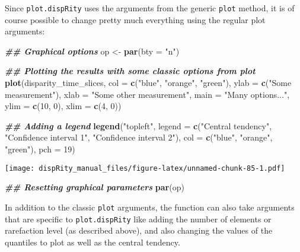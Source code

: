 \documentclass[
]{book}
\newenvironment{Shaded}{\begin{snugshade}}{\end{snugshade}}
\newcommand{\AttributeTok}[1]{\textcolor[rgb]{0.13,0.29,0.53}{#1}}
\newcommand{\DecValTok}[1]{\textcolor[rgb]{0.00,0.00,0.81}{#1}}
\newcommand{\DocumentationTok}[1]{\textcolor[rgb]{0.56,0.35,0.01}{\textbf{\textit{#1}}}}
\newcommand{\FunctionTok}[1]{\textcolor[rgb]{0.13,0.29,0.53}{\textbf{#1}}}
\newcommand{\NormalTok}[1]{#1}
\newcommand{\OtherTok}[1]{\textcolor[rgb]{0.56,0.35,0.01}{#1}}
\newcommand{\StringTok}[1]{\textcolor[rgb]{0.31,0.60,0.02}{#1}}
\begin{document}
Since \texttt{plot.dispRity} uses the arguments from the generic \texttt{plot} method, it is of course possible to change pretty much everything using the regular plot arguments:

\begin{Shaded}
\begin{Highlighting}[]
\DocumentationTok{\#\# Graphical options}
\NormalTok{op }\OtherTok{\textless{}{-}} \FunctionTok{par}\NormalTok{(}\AttributeTok{bty =} \StringTok{"n"}\NormalTok{)}

\DocumentationTok{\#\# Plotting the results with some classic options from plot}
\FunctionTok{plot}\NormalTok{(disparity\_time\_slices, }\AttributeTok{col =} \FunctionTok{c}\NormalTok{(}\StringTok{"blue"}\NormalTok{, }\StringTok{"orange"}\NormalTok{, }\StringTok{"green"}\NormalTok{),}
    \AttributeTok{ylab =} \FunctionTok{c}\NormalTok{(}\StringTok{"Some measurement"}\NormalTok{), }\AttributeTok{xlab =} \StringTok{"Some other measurement"}\NormalTok{,}
    \AttributeTok{main =} \StringTok{"Many options..."}\NormalTok{, }\AttributeTok{ylim =} \FunctionTok{c}\NormalTok{(}\DecValTok{10}\NormalTok{, }\DecValTok{0}\NormalTok{), }\AttributeTok{xlim =} \FunctionTok{c}\NormalTok{(}\DecValTok{4}\NormalTok{, }\DecValTok{0}\NormalTok{))}

\DocumentationTok{\#\# Adding a legend}
\FunctionTok{legend}\NormalTok{(}\StringTok{"topleft"}\NormalTok{, }\AttributeTok{legend =} \FunctionTok{c}\NormalTok{(}\StringTok{"Central tendency"}\NormalTok{,}
                             \StringTok{"Confidence interval 1"}\NormalTok{,}
                             \StringTok{"Confidence interval 2"}\NormalTok{),}
      \AttributeTok{col =} \FunctionTok{c}\NormalTok{(}\StringTok{"blue"}\NormalTok{, }\StringTok{"orange"}\NormalTok{, }\StringTok{"green"}\NormalTok{), }\AttributeTok{pch =} \DecValTok{19}\NormalTok{)}
\end{Highlighting}
\end{Shaded}

\texttt{[image: dispRity\_manual\_files/figure-latex/unnamed-chunk-85-1.pdf]}

\begin{Shaded}
\begin{Highlighting}[]
\DocumentationTok{\#\# Resetting graphical parameters}
\FunctionTok{par}\NormalTok{(op)}
\end{Highlighting}
\end{Shaded}

In addition to the classic \texttt{plot} arguments, the function can also take arguments that are specific to \texttt{plot.dispRity} like adding the number of elements or rarefaction level (as described above), and also changing the values of the quantiles to plot as well as the central tendency.
\end{document}
